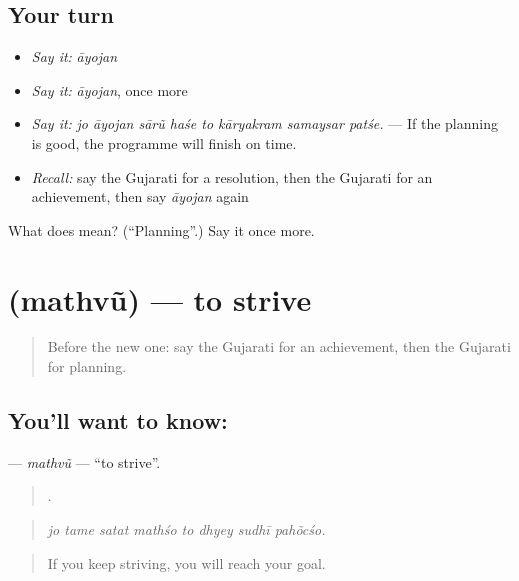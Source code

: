 \subsection*{Your turn}
\begin{itemize}
\raggedright
  \item \emph{Say it:} \emph{āyojan}
  \item \emph{Say it:} \emph{āyojan}, once more
  \item \emph{Say it:} \emph{jo āyojan sārũ haśe to kāryakram samaysar patśe.} — If the planning is good, the programme will finish on time.
  \item \emph{Recall:} say the Gujarati for a resolution, then the Gujarati for an achievement, then say \emph{āyojan} again
\end{itemize}

\begin{tcolorbox}[breakable,colback=teal!4,colframe=teal!35!black,title={Before you move on}]
What does  mean? (\textquotedblleft{}Planning\textquotedblright{}.) Say it once more.
\end{tcolorbox}
\section[\texorpdfstring{\gu{મથવું} (mathvũ)}{મથવું (mathvũ)}]{ (mathvũ) — to strive}

\label{lesson:GU-C382-mathvu}



\begin{quote}
Before the new one: say the Gujarati for an achievement, then the Gujarati for planning.
\end{quote}

\subsection*{You'll want to know: }
\textbf{} — \emph{mathvũ} — \textquotedblleft{}to strive\textquotedblright{}.

\begin{quote}
       .
\end{quote}

\begin{quote}
\emph{jo tame satat mathśo to dhyey sudhī pahõcśo.}
\end{quote}

\begin{quote}
If you keep striving, you will reach your goal.
\end{quote}

